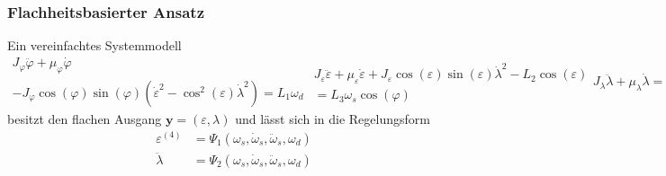 \documentclass[times, 9pt,twocolumn]{article}
\newcommand{\vect}[1]{\boldsymbol #1}
\begin{document}
	\subsubsection{Flachheitsbasierter Ansatz}
	Ein vereinfachtes Systemmodell
	\begin{subequations}
			\begin{multline}
J_\varphi \ddot{\varphi} +\mu_\varphi \dot \varphi\\
- J_\varphi \cos(\varphi) \sin(\varphi) (\dot \varepsilon^2-\cos^2(\varepsilon) \dot \lambda^2) = L_1 \omega_d
\label{eq:flat1}
			\end{multline}
			\begin{multline}
J_\varepsilon \ddot{\varepsilon} + \mu_\varepsilon \dot\varepsilon + J_\varepsilon \cos(\varepsilon) \sin(\varepsilon) \dot\lambda^2 - L_2 \cos (\varepsilon)\\
 = L_3 \omega_s \cos (\varphi)
\label{eq:flat2}
			\end{multline}
			\begin{equation}
J_\lambda \ddot \lambda + \mu_\lambda \dot\lambda = L_4 \omega_s \sin (\varphi) \cos (\varepsilon)
\label{eq:flat3}
			\end{equation}
	\end{subequations}
	besitzt den flachen Ausgang
	\(
		\vect y = (\varepsilon, \lambda)
	\)
	und lässt sich in die Regelungsform
	\begin{subequations}
		\begin{align}
			\varepsilon^{(4)} &= \Psi_1(\omega_s, \dot{\omega}_s, \ddot{\omega}_s, \omega_d)\\
			\ddot \lambda &= \Psi_2(\omega_s, \dot{\omega}_s, \ddot{\omega}_s, \omega_d)
		\end{align}
	\end{subequations}
\end{document}
